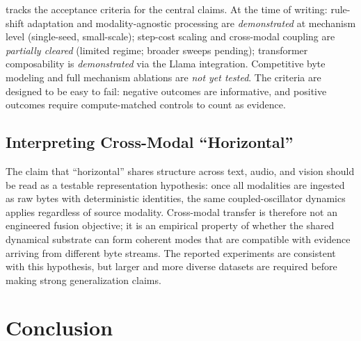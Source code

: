 \documentclass[11pt,a4paper]{article}
\begin{document}
 tracks the acceptance criteria for the central claims. At the time of writing: rule-shift adaptation and modality-agnostic processing are \emph{demonstrated} at mechanism level (single-seed, small-scale); step-cost scaling and cross-modal coupling are \emph{partially cleared} (limited regime; broader sweeps pending); transformer composability is \emph{demonstrated} via the Llama integration.  Competitive byte modeling and full mechanism ablations are \emph{not yet tested}.  The criteria are designed to be easy to fail: negative outcomes are informative, and positive outcomes require compute-matched controls to count as evidence.

\subsection{Interpreting Cross-Modal ``Horizontal''}

The claim that ``horizontal'' shares structure across text, audio, and vision should be read as a testable representation hypothesis: once all modalities are ingested as raw bytes with deterministic identities, the same coupled-oscillator dynamics applies regardless of source modality. Cross-modal transfer is therefore not an engineered fusion objective; it is an empirical property of whether the shared dynamical substrate can form coherent modes that are compatible with evidence arriving from different byte streams. The reported experiments are consistent with this hypothesis, but larger and more diverse datasets are required before making strong generalization claims.





\section{Conclusion}
\label{sec:conclusion}
\end{document}
